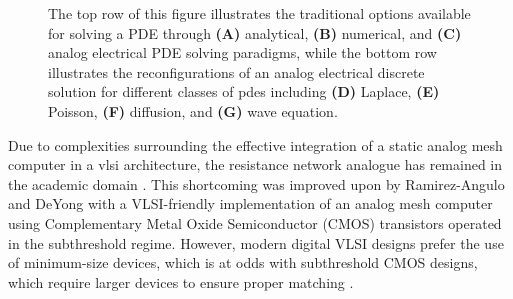 \begin{figure}[ht]
    \centering{}
    \caption{The top row of this figure illustrates the traditional options available for solving a PDE through \textbf{(A)} analytical, \textbf{(B)} numerical, and \textbf{(C)} analog electrical PDE solving paradigms, while the bottom row illustrates the reconfigurations of an analog electrical discrete solution for different classes of \acrfull{pde}s including \textbf{(D)} Laplace, \textbf{(E)} Poisson, \textbf{(F)} diffusion, and \textbf{(G)} wave equation.}
    \label{fig:01_analytical_numerical_analog}
\end{figure}

Due to complexities surrounding the effective integration of a static analog mesh computer in a \acrfull{vlsi} architecture, the resistance network analogue has remained in the academic domain \cite{J.Ramirez-Angulo_2000}. This shortcoming was improved upon by Ramirez-Angulo and DeYong \cite{J.Ramirez-Angulo_2000} with a VLSI-friendly implementation of an analog mesh computer using Complementary Metal Oxide Semiconductor (CMOS) transistors operated in the subthreshold regime.  However, modern digital VLSI designs prefer the use of minimum-size devices, which is at odds with subthreshold CMOS designs, which require larger devices to ensure proper matching \cite{A.Hastings_2005}.  

